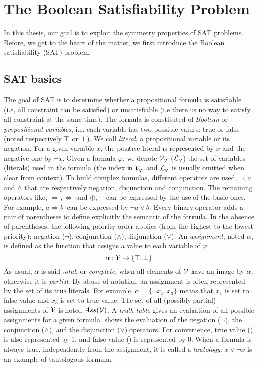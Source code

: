 \chapter{The Boolean Satisfiability Problem}\label{chap:preliminaries}
\minitoc
In this thesis, our goal is to exploit the symmetry properties of SAT problems.
Before, we get to the heart of the matter, we first introduce the Boolean satisfiability (SAT)  problem.
\section{SAT basics}
The goal of SAT is to determine whether a propositional formula is satisfiable (i.e, all constraint can be satisfied)
or unsatisfiable (i.e there us no way to satisfy all constraint at the same time).
The formula is constituted of \emph{Boolean} or \emph{propositional variables},
i.e. each variable has two possible values: true or false (noted respectively $\top$ or $\bot$).
We call \emph{literal}, a propositional variable or its negation.
For a given variable $x$, the positive literal is represented by $x$ and the negative one by $\neg x$.
Given a formula $\varphi$, we denote $\mathcal{V}_\varphi$ ($\mathcal{L}_\varphi$) the set of variables (literals) used in the formula (the index in $\mathcal{V}_\varphi$ and $\mathcal{L}_\varphi$ is usually omitted when
clear from context).
To build complex formulas, different operators are used, $\neg, \lor$ and $\land$ that are respectively negation, disjunction and conjunction. The remaining operators like, $\Rightarrow, \Leftrightarrow$ and
$\oplus, \cdots$ can be expressed by the use of the basic ones.
For example, $a \Rightarrow b$, can be expressed by $ \neg a \lor b$.
Every binary operator adds a pair of parentheses to define explicitly the semantic of the formula.
In the absence of parentheses, the following priority order applies (from the highest to the lowest priority):
negation ($\neg$), conjunction ($\land$), disjunction ($\lor$).
An \emph{assignment}, noted $\alpha$, is defined as the function that assigns a value to each variable of $\varphi$.
 $$\alpha: \mathcal{V} \mapsto \{ \top, \bot \}$$
 As usual, $\alpha$ is said \emph{total}, or \emph{complete}, when all elements of $\mathcal{V}$ have an image by
$\alpha$, otherwise it is \emph{partial}. By abuse of notation, an assignment is
often represented by the set of its true literals. For example, $\alpha = \{\neg x_1, x_3 \}$ means that $x_1$
is set to false value and $x_3$ is set to true value.
  The set of all (possibly partial) assignments of $\mathcal{V}$ is noted $Ass(\mathcal{V})$.
A \emph{truth table} gives an evaluation of all possible assignments for a given formula.
 shows the evaluation of the negation ($\neg$), the conjunction ($\land$), and the disjunction ($\lor$) operators.
For convenience, true value (\true) is also represented by $1$, and false value (\false) is represented by $0$.
When a formula is always true, independently from the assignment, it is called a \emph{tautology}: $x \lor \neg x$ is 
an example of tautologous formula.

